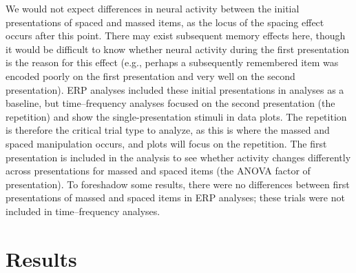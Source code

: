 We would not expect differences in neural activity between the initial presentations of spaced and massed items, as the locus of the spacing effect occurs after this point.
There may exist subsequent memory effects here, though it would be difficult to know whether neural activity during the first presentation is the reason for this effect (e.g., perhaps a subsequently remembered item was encoded poorly on the first presentation and very well on the second presentation).  ERP analyses included these initial presentations in analyses as a baseline, but time--frequency analyses focused on the second presentation (the repetition) and show the single-presentation stimuli in data plots.
The repetition is therefore the critical trial type to analyze, as this is where the massed and spaced manipulation occurs, and plots will focus on the repetition.  The first presentation is included in the analysis to see whether activity changes differently across presentations for massed and spaced items (the ANOVA factor of presentation).  To foreshadow some results, there were no differences between first presentations of massed and spaced items in ERP analyses; these trials were not included in time--frequency analyses.



\section{Results}




